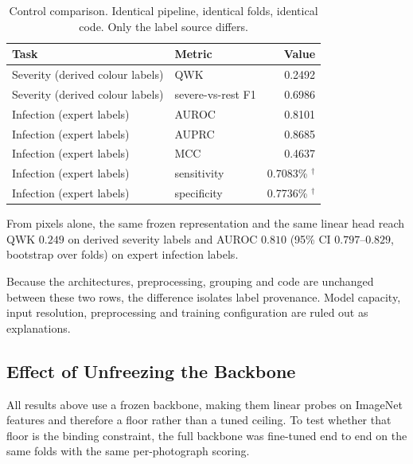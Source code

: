 \begin{table}[!t]
\caption{Control comparison. Identical pipeline, identical folds, identical
code. Only the label source differs.}
\label{tab:control}
\centering
\small
\begin{tabular}{@{}llr@{}}
\toprule
Task & Metric & Value \\
\midrule
Severity (derived colour labels)  & QWK                 & 0.2492 \\
Severity (derived colour labels)  & severe-vs-rest F1   & 0.6986 \\
\midrule
Infection (expert labels)         & AUROC               & 0.8101 \\
Infection (expert labels)         & AUPRC               & 0.8685 \\
Infection (expert labels)         & MCC                 & 0.4637 \\
Infection (expert labels)         & sensitivity         & 0.7083\% $^{\dagger}$ \\
Infection (expert labels)         & specificity         & 0.7736\% $^{\dagger}$ \\
\bottomrule
\end{tabular}
\end{table}

From pixels alone, the same frozen representation and the same linear head
reach QWK $0.249$ on derived severity labels and AUROC $0.810$
(95\% CI $0.797$--$0.829$, bootstrap over folds) on expert infection
labels.

Because the architectures, preprocessing, grouping and code are unchanged
between these two rows, the difference isolates label provenance. Model
capacity, input resolution, preprocessing and training configuration are
ruled out as explanations.

\subsection{Effect of Unfreezing the Backbone}

All results above use a frozen backbone, making them linear probes on
ImageNet features and therefore a floor rather than a tuned ceiling. To
test whether that floor is the binding constraint, the full backbone was
fine-tuned end to end on the same folds with the same per-photograph
scoring.

